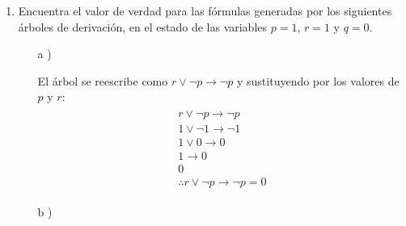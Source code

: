 \documentclass[11pt,letterpaper]{article}
\begin{document}
\begin{enumerate}
    \item Encuentra el valor de verdad para las fórmulas generadas por los
    siguientes árboles de derivación, en el estado de las variables $p = 1$,
    $r = 1$ y $q = 0$. \\
    \begin{enumerate}
        \item [a])\\

            El árbol se reescribe como $r \lor \neg p \to \neg p$ y sustituyendo
            por los valores de $p$ y $r$:
                \begin{equation}
                \begin{split}
                \begin{aligned}
                    r \lor \neg p \to \neg p \\
                    1 \lor \neg 1 \to \neg 1 \\
                    1 \lor 0 \to 0 \\
                    1 \to 0 \\
                    0 \\
                    \therefore r \lor \neg p \to \neg p = 0
                \end{aligned}
                \end{split}
                \end{equation}
    \clearpage
    \item [b])\\


\end{enumerate}
\end{enumerate}
\end{document}
